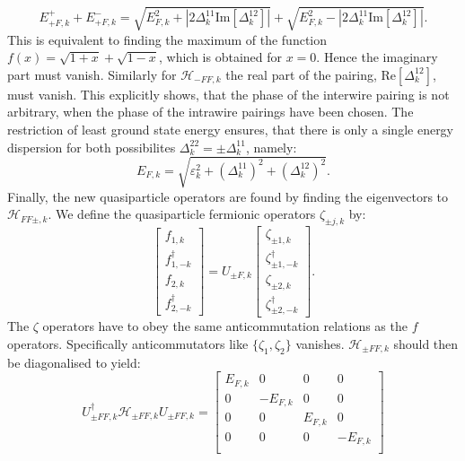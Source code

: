 \begin{equation}
E^{+}_{+F,k} + E^{-}_{+F,k} = \sqrt{E^2_{F,k} + \left|2\Delta^{11}_k\text{Im}\left[\Delta^{12}_k\right]\right|} + \sqrt{E^2_{F,k} - \left|2\Delta^{11}_k\text{Im}\left[\Delta^{12}_k\right]\right|}. \nonumber
\end{equation}
This is equivalent to finding the maximum of the function $f(x) = \sqrt{1 + x} + \sqrt{1 - x}$, which is obtained for $x=0$. Hence the imaginary part must vanish. Similarly for $\mathcal{H}_{-FF,k}$ the real part of the pairing, $\text{Re}\left[\Delta^{12}_k\right]$, must vanish. This explicitly shows, that the phase of the interwire pairing is not arbitrary, when the phase of the intrawire pairings have been chosen. The restriction of least ground state energy ensures, that there is only a single energy dispersion for both possibilites $\Delta^{22}_k = \pm \Delta^{11}_k$, namely:
\begin{equation}
E_{F,k} = \sqrt{\varepsilon^2_k + \left(\Delta^{11}_k\right)^2 + \left(\Delta^{12}_k\right)^2}.
\label{eq.energydispersiontwowires}
\end{equation}
Finally, the new quasiparticle operators are found by finding the eigenvectors to $\mathcal{H}_{FF\pm,k}$. We define the quasiparticle fermionic operators $\zeta_{\pm j,k}$ by:
\begin{equation}
\begin{bmatrix} f_{1,k} \\ f^\dagger_{1,-k} \\ f_{2,k} \\ f^\dagger_{2,-k} \end{bmatrix} = U_{\pm F,k}\begin{bmatrix} \zeta_{\pm 1,k} \\ \zeta^{\dagger}_{\pm 1,-k} \\ \zeta_{\pm 2,k} \\ \zeta^{\dagger}_{\pm 2,-k} \end{bmatrix}.
\label{eq.zetaoperatorstwowiresdefinition}
\end{equation} 
The $\zeta$ operators have to obey the same anticommutation relations as the $f$ operators. Specifically anticommutators like $\{\zeta_1, \zeta_2 \} $ vanishes. $\mathcal{H}_{\pm FF,k}$ should then be diagonalised to yield:
\begin{equation}
U^\dagger_{\pm FF,k}\mathcal{H}_{\pm FF,k}U_{\pm FF,k} = \begin{bmatrix} 
E_{F,k} & 0        & 0       & 0        \\ 
0       & -E_{F,k} & 0       & 0        \\ 
0       & 0        & E_{F,k} & 0        \\ 
0       & 0        & 0       & -E_{F,k} \\ 
\end{bmatrix} \nonumber
\end{equation}
